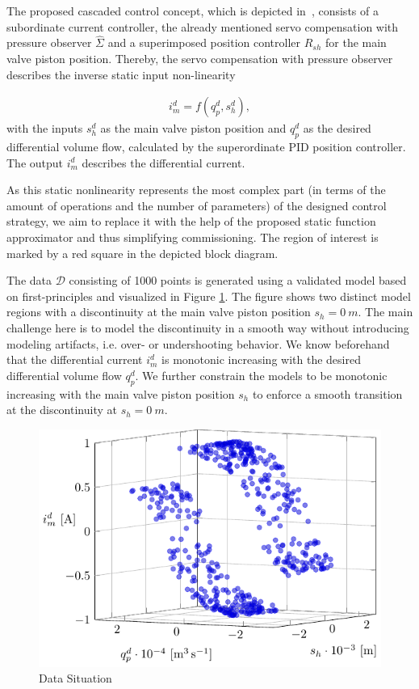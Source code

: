 The proposed cascaded control concept, which is depicted in~, consists of a subordinate current controller, the already mentioned servo compensation with pressure observer $\hat{\Sigma}$ and a superimposed position controller $R_{sh}$ for the main valve piston position. Thereby, the servo compensation with pressure observer describes the inverse static input non-linearity 

\begin{align}
	i_m^d = f(q_p^d, s_h^d),
\end{align}
%
with the inputs $s_h^d$ as the main valve piston position and $q_p^d$ as the desired differential volume flow, calculated by the superordinate PID position controller. The output $i_m^d$ describes the differential current. 


As this static nonlinearity represents the most complex part (in terms of the amount of operations and the number of parameters) of the designed control strategy, we aim to replace it with the help of the proposed static function approximator and thus simplifying commissioning. The region of interest is marked by a red square in the depicted block diagram.


The data $\mathcal{D}$ consisting of 1000 points is generated using a validated model based on first-principles and visualized in Figure \ref{fig:bosch_data_situation}. The figure shows two distinct model regions with a discontinuity at the main valve piston position $s_h = 0 \ \si{m}$. The main challenge here is to model the discontinuity in a smooth way without introducing modeling artifacts, i.e. over- or undershooting behavior. We know beforehand that the differential current $i_m^d$ is monotonic increasing with the desired differential volume flow $q_p^d$. We further constrain the models to be monotonic increasing with the main valve piston position $s_h$ to enforce a smooth transition at the discontinuity at $s_h = 0 \ \si{m}$.

\begin{figure}[H]
	\centering
	\includegraphics{graphics/pgfplots/cha5/Bosch/data_situation.pdf} 
	\caption{Data Situation}
	\label{fig:bosch_data_situation}
\end{figure}

